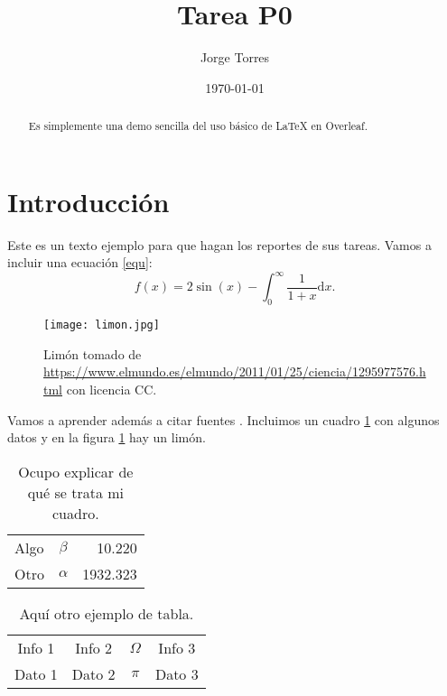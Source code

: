 \documentclass{article}
\title{Tarea P0} %
\author{Jorge Torres} %
\date{\today}
\begin{document}

\maketitle %

\begin{abstract} %
  Es simplemente una demo sencilla del uso b\'{a}sico de \LaTeX{} en
  Overleaf.
\end{abstract}

\section{Introducci\'{o}n}\label{intro} %



Este es un texto ejemplo para que hagan los reportes de sus
tareas. Vamos a incluir una ecuaci\'{o}n \eqref{equ}:
\begin{equation}
  f(x) = 2 \sin(x) - \int_0^\infty \frac{1}{1 + x} \text{d}x.
  \label{equ}
\end{equation}

\begin{figure} %
    \centering
    \texttt{[image: limon.jpg]} %
    \caption{Lim\'{o}n tomado de \url{https://www.elmundo.es/elmundo/2011/01/25/ciencia/1295977576.html} con licencia CC.}
    \label{limon}
\end{figure}

\newpage

Vamos a aprender adem\'{a}s a citar fuentes \citep{ejemplo}. Incluimos un
cuadro \ref{datos} con algunos datos y en la figura \ref{limon} hay un
lim\'{o}n.

\begin{table} %
    \caption{Ocupo explicar de qu\'{e} se trata mi cuadro.} %
    \label{datos} %
    \centering %
    \begin{tabular}{l|cr} %
         Algo & $\beta$ & 10.220 \\
         Otro & $\alpha$ & 1932.323
    \end{tabular}
\end{table}

\begin{table}
    \caption{Aqu\'{i} otro ejemplo de tabla.}
    \label{otros_datos}
    \centering
    \begin{tabular}{c|c|c|c}
      Info 1 & Info 2 & $\Omega$ & Info 3 \\
      Dato 1 & Dato 2 & $\pi$ & Dato 3
    \end{tabular}
\end{table}
\end{document}
